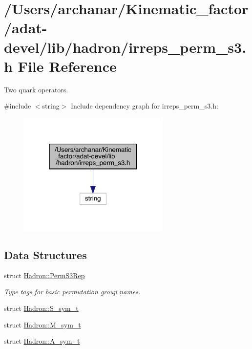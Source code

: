 \hypertarget{adat-devel_2lib_2hadron_2irreps__perm__s3_8h}{}\section{/\+Users/archanar/\+Kinematic\+\_\+factor/adat-\/devel/lib/hadron/irreps\+\_\+perm\+\_\+s3.h File Reference}
\label{adat-devel_2lib_2hadron_2irreps__perm__s3_8h}


Two quark operators.  


{\ttfamily \#include $<$string$>$}\newline
Include dependency graph for irreps\+\_\+perm\+\_\+s3.\+h\+:
\nopagebreak
\begin{figure}[H]
\begin{center}
\leavevmode
\includegraphics[width=214pt]{df/d10/adat-devel_2lib_2hadron_2irreps__perm__s3_8h__incl}
\end{center}
\end{figure}
\subsection*{Data Structures}
\begin{DoxyCompactItemize}
\item 
struct \mbox{\hyperlink{structHadron_1_1PermS3Rep}{Hadron\+::\+Perm\+S3\+Rep}}
\begin{DoxyCompactList}\small\item\em Type tags for basic permutation group names. \end{DoxyCompactList}\item 
struct \mbox{\hyperlink{structHadron_1_1S__sym__t}{Hadron\+::\+S\+\_\+sym\+\_\+t}}
\item 
struct \mbox{\hyperlink{structHadron_1_1M__sym__t}{Hadron\+::\+M\+\_\+sym\+\_\+t}}
\item 
struct \mbox{\hyperlink{structHadron_1_1A__sym__t}{Hadron\+::\+A\+\_\+sym\+\_\+t}}
\end{DoxyCompactItemize}
